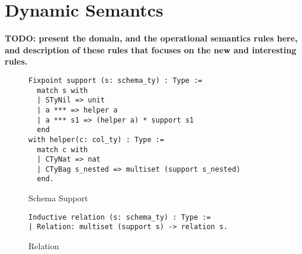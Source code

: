 \section{Dynamic Semantcs}
\label{sec:semantics}

{\bf TODO: present the domain, and the operational semantics rules here, 
and description of these rules that focuses on the new and interesting rules.}

\begin{figure}
\begin{center}
\begin{lstlisting}
Fixpoint support (s: schema_ty) : Type :=
  match s with
  | STyNil => unit
  | a *** => helper a
  | a *** s1 => (helper a) * support s1
  end
with helper(c: col_ty) : Type :=
  match c with
  | CTyNat => nat
  | CTyBag s_nested => multiset (support s_nested)
  end.
\end{lstlisting}
\end{center}
\caption{Schema Support}
\label{fig-schema_support}
\end{figure}

\begin{figure}
\begin{center}
\begin{lstlisting}
Inductive relation (s: schema_ty) : Type := 
| Relation: multiset (support s) -> relation s.
\end{lstlisting}
\end{center}
\caption{Relation}
\label{fig-relation}
\end{figure}

